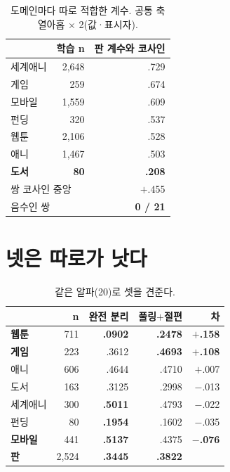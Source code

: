 \documentclass[10pt]{article}
\begin{document}
\begin{table}[t]
\centering\tsize
\caption{도메인마다 따로 적합한 계수. 공통 축 열아홉 $\times$ 2(값·표시자).}
\begin{tabular}{lrr}
\toprule
& 학습 n & 판 계수와 코사인 \\
\midrule
세계애니 & 2{,}648 & .729 \\
게임 & 259 & .674 \\
모바일 & 1{,}559 & .609 \\
펀딩 & 320 & .537 \\
웹툰 & 2{,}106 & .528 \\
애니 & 1{,}467 & .503 \\
\textbf{도서} & \textbf{80} & \textbf{.208} \\
\midrule
\multicolumn{2}{l}{쌍 코사인 중앙} & $+$.455 \\
\multicolumn{2}{l}{음수인 쌍} & \textbf{0 / 21} \\
\bottomrule
\end{tabular}
\end{table}



\section{넷은 따로가 낫다}

\begin{table}[t]
\centering\tsize
\caption{같은 알파(20)로 셋을 견준다.}
\begin{tabular}{lrrrr}
\toprule
& n & 완전 분리 & 풀링$+$절편 & 차 \\
\midrule
\textbf{웹툰} & 711 & \textbf{.0902} & \textbf{.2478} & \textbf{$+$.158} \\
\textbf{게임} & 223 & .3612 & \textbf{.4693} & \textbf{$+$.108} \\
애니 & 606 & .4644 & .4710 & $+$.007 \\
도서 & 163 & .3125 & .2998 & $-$.013 \\
세계애니 & 300 & \textbf{.5011} & .4793 & $-$.022 \\
펀딩 & 80 & \textbf{.1954} & .1602 & $-$.035 \\
\textbf{모바일} & 441 & \textbf{.5137} & .4375 & \textbf{$-$.076} \\
\midrule
\textbf{판} & 2{,}524 & \textbf{.3445} & \textbf{.3822} & \\
\bottomrule
\end{tabular}
\end{table}
\end{document}
